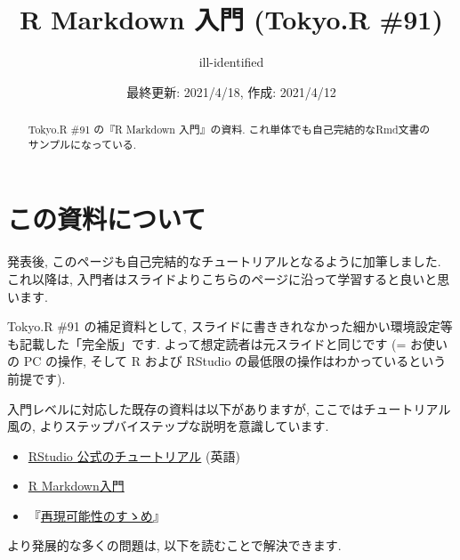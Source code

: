 \documentclass[
]{ltjsarticle}
\title{R Markdown 入門 (Tokyo.R \#91)}
\author{ill-identified}
\date{最終更新: 2021/4/18, 作成: 2021/4/12}
\providecommand{\tightlist}{%
  \setlength{\itemsep}{0pt}\setlength{\parskip}{0pt}}
\newenvironment{infobox}[1]{\begin{itemize}\renewcommand{\labelitemi}{\raisebox{-.7\height}[0pt][0pt]{%
  {\setkeys{Gin}{width=3em,keepaspectratio}\texttt{[image: \_latex/\_img/\#1]}}}}
  \setlength{\fboxsep}{1em}
  \begin{greyblock}
  \item
  }{\end{greyblock}\end{itemize}
}
\begin{document}
\maketitle
\begin{abstract}
Tokyo.R \#91 の『R Markdown 入門』の資料. これ単体でも自己完結的なRmd文書のサンプルになっている.
\end{abstract}

{
\setcounter{tocdepth}{2}
\tableofcontents
}
\hypertarget{intro}{%
\section*{この資料について}\label{intro}}

\begin{infobox}{important}
発表後, このページも自己完結的なチュートリアルとなるように加筆しました. これ以降は, 入門者はスライドよりこちらのページに沿って学習すると良いと思います.

\end{infobox}

Tokyo.R \#91 の補足資料として, スライドに書ききれなかった細かい環境設定等も記載した「完全版」です. よって想定読者は元スライドと同じです (= お使いの PC の操作, そして R および RStudio の最低限の操作はわかっているという前提です).

入門レベルに対応した既存の資料は以下がありますが, ここではチュートリアル風の, よりステップバイステップな説明を意識しています.

\begin{itemize}
\tightlist
\item
  \href{https://rmarkdown.rstudio.com/lesson-1.html}{RStudio 公式のチュートリアル} (英語)
\item
  \href{https://kazutan.github.io/kazutanR/Rmd_intro.html}{R Markdown入門}
\item
  \citet{Takahashi2018}『\href{https://www.kyoritsu-pub.co.jp/bookdetail/9784320112438}{再現可能性のすゝめ}』
\end{itemize}

より発展的な多くの問題は, 以下を読むことで解決できます.
\end{document}
